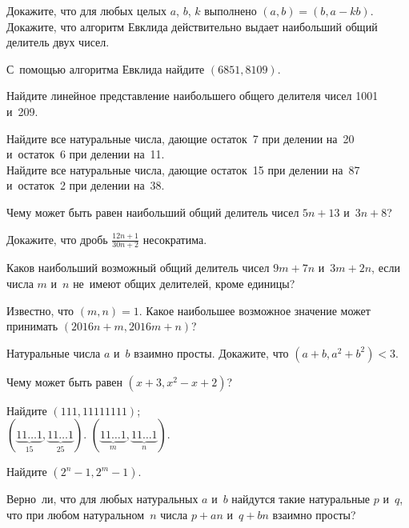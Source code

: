 \begin{problems}

\subproblem
Докажите, что для любых целых $a$, $b$, $k$ выполнено $(a, b) = (b, a - k b)$.
\\
\subproblem
Докажите, что алгоритм Евклида действительно выдает наибольший общий делитель
двух чисел.

\item
С~помощью алгоритма Евклида найдите $(6851, 8109)$.

\item
Найдите линейное представление наибольшего общего делителя чисел 1001 и~209.

\item
\subproblem
Найдите все натуральные числа, дающие остаток~7 при делении на~20 и~остаток~6
при делении на~11.
\\
\subproblem
Найдите все натуральные числа, дающие остаток~15 при делении на~87 и~остаток~2
при делении на~38.

\item
Чему может быть равен наибольший общий делитель чисел $5 n + 13$ и~$3 n + 8$?

\item
Докажите, что дробь $\frac{12 n + 1}{30 n + 2}$ несократима.

\item
Каков наибольший возможный общий делитель чисел $9 m + 7 n$ и~$3 m + 2 n$, если
числа $m$ и~$n$ не~имеют общих делителей, кроме единицы?

\item
Известно, что $(m, n) = 1$.
Какое наибольшее возможное значение может принимать $(2016 n + m, 2016 m + n)$?

\item
Натуральные числа $a$ и~$b$ взаимно просты.
Докажите, что $(a + b, a^2 + b^2) < 3$.

\item
Чему может быть равен $(x + 3, x^2 - x + 2)$?

\item
Найдите
\qquad
\subproblem $(111, 11111111)$;
\\[0.3ex]
\subproblem
$(\underbrace{11 \ldots 1}_{15}, \underbrace{11 \ldots 1}_{25})$.
\qquad
\subproblem
$(\underbrace{11 \ldots 1}_{m}, \underbrace{11 \ldots 1}_{n})$.

\item
Найдите $(2^{n} - 1, 2^{m} - 1)$.

\item
Верно~ли, что для любых натуральных $a$ и~$b$ найдутся такие натуральные $p$
и~$q$, что при любом натуральном~$n$ числа $p + a n$ и~$q + b n$ взаимно
просты?

\end{problems}


